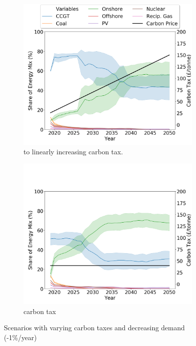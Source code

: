 \begin{figure}
	\centering
	\begin{subfigure}{.8\linewidth}
		\includegraphics[width=\linewidth]{Chapter4/figures/scenarios/demand099-carbon18-datetime.png}
		\caption{ to  linearly increasing carbon tax.}
		\label{fig:demand99carbon18}
	\end{subfigure}
	\begin{subfigure}{.8\linewidth}
		\includegraphics[width=\linewidth]{Chapter4/figures/scenarios/demand099-carbon40-datetime.png}
		\caption{{ carbon tax}}
		\label{fig:demand99carbon40}
	\end{subfigure}
	\caption{Scenarios with varying carbon taxes and decreasing demand (-1\%/year)}
\end{figure}






